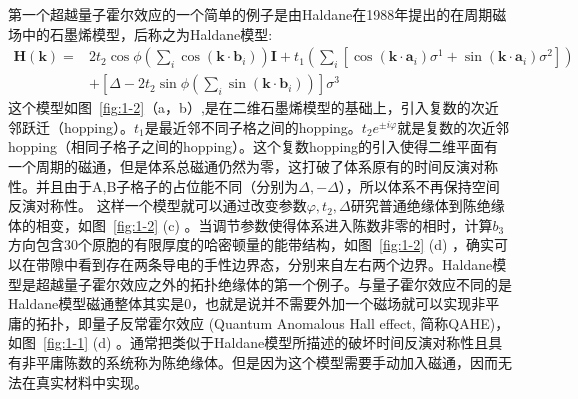 第一个超越量子霍尔效应的一个简单的例子是由Haldane在1988年提出的在周期磁场中的石墨烯模型，后称之为Haldane模型\citep{haldane1988model,Haldane2}:
\begin{equation}
    \label{eq:1-2}
    \begin{split}
    \mathbf{H}(\mathbf{k})=&2 t_{2} \cos \phi\left(\sum_{i} \cos \left(\mathbf{k} \cdot \mathbf{b}_{i}\right)\right) \mathbf{I}+t_{1}\left(\sum_{i}\left[\cos \left(\mathbf{k} \cdot \mathbf{a}_{i}\right) \sigma^{1}+\sin \left(\mathbf{k} \cdot \mathbf{a}_{i}\right) \sigma^{2}\right]\right)\\
    &+\left[\Delta-2 t_{2} \sin \phi\left(\sum_{i} \sin \left(\mathbf{k} \cdot \mathbf{b}_{i}\right)\right)\right] \sigma^{3}
    \end{split}
\end{equation}
这个模型如图~\ref{fig:1-2}（a，b）,是在二维石墨烯模型的基础上，引入复数的次近邻跃迁（hopping）。$t_{1}$是最近邻不同子格之间的hopping。$t_{2} e^{\pm i \varphi}$就是复数的次近邻hopping（相同子格子之间的hopping）。这个复数hopping的引入使得二维平面有一个周期的磁通，但是体系总磁通仍然为零，这打破了体系原有的时间反演对称性。并且由于A,B子格子的占位能不同（分别为$\Delta,-\Delta$），所以体系不再保持空间反演对称性。
这样一个模型就可以通过改变参数$\varphi, t_2, \Delta$研究普通绝缘体到陈绝缘体的相变\citep{haldane1988model,Haldane2}，如图~\ref{fig:1-2} (c) 。当调节参数使得体系进入陈数非零的相时，计算$b_3$方向包含30个原胞的有限厚度的哈密顿量的能带结构，如图~\ref{fig:1-2} (d) ，确实可以在带隙中看到存在两条导电的手性边界态，分别来自左右两个边界。Haldane模型是超越量子霍尔效应之外的拓扑绝缘体的第一个例子。与量子霍尔效应不同的是Haldane模型磁通整体其实是0，也就是说并不需要外加一个磁场就可以实现非平庸的拓扑，即量子反常霍尔效应 (Quantum Anomalous Hall effect, 简称QAHE)，如图~\ref{fig:1-1} (d) 。通常把类似于Haldane模型所描述的破坏时间反演对称性且具有非平庸陈数的系统称为陈绝缘体。但是因为这个模型需要手动加入磁通，因而无法在真实材料中实现。

